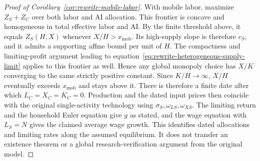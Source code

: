 \begin{proof}[Proof of Corollary~\ref{cor:rewrite-mobile-labor}]
With mobile labor, maximize $Z_S+Z_C$ over both labor and AI allocation.
This frontier is concave and homogeneous in total effective labor and AI.
By the finite threshold above, it equals $Z_S(H,X)$ whenever
$X/H>x_{\mathrm{mob}}$. Its high-supply slope is therefore $c_S$,
and it admits a supporting affine bound per unit of $H$.
The compactness and limiting-profit argument leading to
equation~\eqref{eq:rewrite-heterogeneous-supply-limit} applies to this
frontier as well. Hence any global monopoly choice has $X/K$ converging
to the same strictly positive constant. Since $K/H\to\infty$, $X/H$
eventually exceeds $x_{\mathrm{mob}}$ and stays above it.
There is therefore a finite date after which $L_C=X_C=K_C=0$.
Production and the dated input prices then coincide with the original
single-activity technology using $\sigma_S,\omega_{LS},\omega_{XS}$.
The limiting return and the household Euler equation give $g$ as stated,
and the wage equation with $L_S=N$ gives the claimed average wage growth.
This identifies dated allocations and limiting rates along the assumed
equilibrium. It does not transfer an existence theorem or a global
research-verification argument from the original model.
\end{proof}
